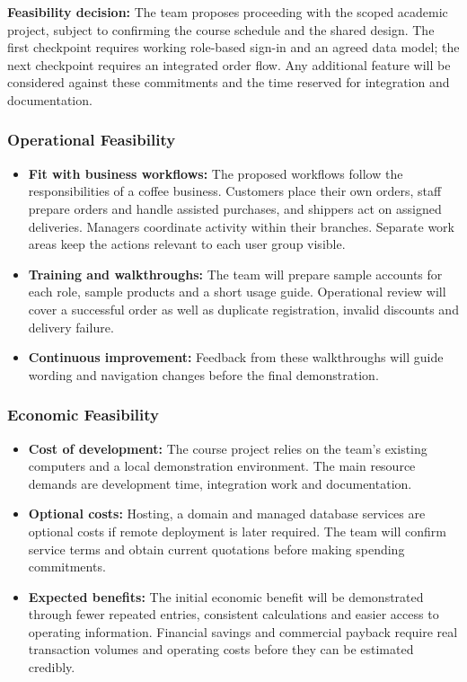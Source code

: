 \textbf{Feasibility decision:} The team proposes proceeding with the scoped academic project, subject to confirming the course schedule and the shared design. The first checkpoint requires working role-based sign-in and an agreed data model; the next checkpoint requires an integrated order flow. Any additional feature will be considered against these commitments and the time reserved for integration and documentation.

\subsubsection{Operational Feasibility}

\begin{itemize}
  \item \textbf{Fit with business workflows:} The proposed workflows follow the responsibilities of a coffee business. Customers place their own orders, staff prepare orders and handle assisted purchases, and shippers act on assigned deliveries. Managers coordinate activity within their branches. Separate work areas keep the actions relevant to each user group visible.
  \item \textbf{Training and walkthroughs:} The team will prepare sample accounts for each role, sample products and a short usage guide. Operational review will cover a successful order as well as duplicate registration, invalid discounts and delivery failure.
  \item \textbf{Continuous improvement:} Feedback from these walkthroughs will guide wording and navigation changes before the final demonstration.
\end{itemize}

\subsubsection{Economic Feasibility}

\begin{itemize}
  \item \textbf{Cost of development:} The course project relies on the team's existing computers and a local demonstration environment. The main resource demands are development time, integration work and documentation.
  \item \textbf{Optional costs:} Hosting, a domain and managed database services are optional costs if remote deployment is later required. The team will confirm service terms and obtain current quotations before making spending commitments.
  \item \textbf{Expected benefits:} The initial economic benefit will be demonstrated through fewer repeated entries, consistent calculations and easier access to operating information. Financial savings and commercial payback require real transaction volumes and operating costs before they can be estimated credibly.
\end{itemize}

